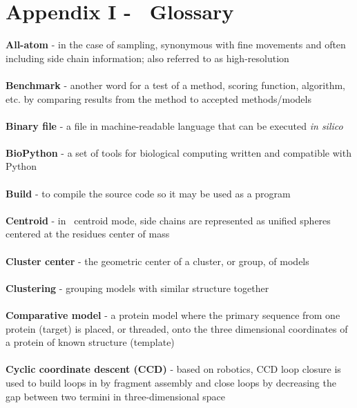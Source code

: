 \section{Appendix I - \rosetta~Glossary}
\label{sec:appI}
\singlespace
\setlength{\parindent}{0pt}

\textbf{All-atom} - in the case of sampling, synonymous with fine movements and often including side chain information; also referred to as high-resolution \\ \\

\textbf{Benchmark} - another word for a test of a method, scoring function, algorithm, etc. by comparing results from the method to accepted methods/models \\ \\

\textbf{Binary file} - a file in machine-readable language that can be executed \textit{in silico} \\ \\

\textbf{BioPython} - a set of tools for biological computing written and compatible with Python \\ \\

\textbf{Build} - to compile the source code so it may be used as a program \\ \\

\textbf{Centroid} - in \rosetta~centroid mode, side chains are represented as unified spheres centered at the residues center of mass \\ \\

\textbf{Cluster center} - the geometric center of a cluster, or group, of models \\ \\

\textbf{Clustering} -  grouping models with similar structure together \\ \\

\textbf{Comparative model} - a protein model where the primary sequence from one protein (target) is placed, or threaded, onto the three dimensional coordinates of a protein of known structure (template) \\ \\

\textbf{Cyclic coordinate descent (CCD)} - based on robotics, CCD loop closure is used to build loops in \rosetta by fragment assembly and close loops by decreasing the gap between two termini in three-dimensional space \\ \\

